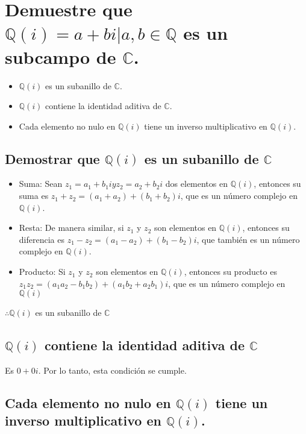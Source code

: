 \section{Demuestre que $\mathbb{Q}(i) = {a + bi | a, b \in \mathbb{Q}}$ es un subcampo de $\mathbb{C}$.}

\begin{itemize}
	\item $\mathbb{Q}(i)$ es un subanillo de $\mathbb{C}$.
	\item $\mathbb{Q}(i)$ contiene la identidad aditiva de $\mathbb{C}$.
	\item Cada elemento no nulo en $\mathbb{Q}(i)$ tiene un inverso multiplicativo en $\mathbb{Q}(i)$.
\end{itemize}

\subsection{Demostrar que $\mathbb{Q}(i)$ es un subanillo de $\mathbb{C}$}

\begin{itemize}
	\item Suma: Sean $z_1 = a_1 + b_1i y z_2 = a_2 + b_2i$ dos elementos en $\mathbb{Q}(i)$, entonces su suma es $z_1 + z_2 = (a_1 + a_2) + (b_1 + b_2)i$, que es un número complejo en $\mathbb{Q}(i)$.
	\item Resta: De manera similar, si $z_1$ y $z_2$ son elementos en $\mathbb{Q}(i)$, entonces su diferencia es $z_1 - z_2 = (a_1 - a_2) + (b_1 - b_2)i$, que también es un número complejo en $\mathbb{Q}(i)$.
	\item Producto: Si $z_1$ y $z_2$ son elementos en $\mathbb{Q}(i)$, entonces su producto es $z_1z_2 = (a_1a_2 - b_1b_2) + (a_1b_2 + a_2b_1)i$, que es un número complejo en $\mathbb{Q}(i)$
\end{itemize}

$\therefore \mathbb{Q}(i)$ es un subanillo de $\mathbb{C}$

\subsection{$\mathbb{Q}(i)$ contiene la identidad aditiva de $\mathbb{C}$}

Es $0 + 0i$. Por lo tanto, esta condición se cumple.

\subsection{Cada elemento no nulo en $\mathbb{Q}(i)$ tiene un inverso multiplicativo en $\mathbb{Q}(i)$.}

